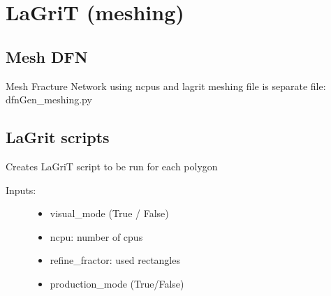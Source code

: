 \documentclass[letterpaper,10pt,english]{sphinxmanual}
\begin{document}
\section{LaGriT (meshing)}
\label{\detokenize{pydfnworks:lagrit-meshing}}

\subsection{Mesh DFN}
\label{\detokenize{pydfnworks:module-pydfnworks.meshdfn}}\label{\detokenize{pydfnworks:mesh-dfn}}\label{\detokenize{pydfnworks:module-meshdfn.py}}

\begin{fulllineitems}
\label{\detokenize{pydfnworks:pydfnworks.meshdfn.mesh_network}}
Mesh Fracture Network using ncpus and lagrit
meshing file is separate file: dfnGen\_meshing.py

\end{fulllineitems}



\subsection{LaGrit scripts}
\label{\detokenize{pydfnworks:lagrit-scripts}}\label{\detokenize{pydfnworks:module-pydfnworks.lagrit_scripts}}\label{\detokenize{pydfnworks:module-lagrit_scripts.py}}

\begin{fulllineitems}
\label{\detokenize{pydfnworks:pydfnworks.lagrit_scripts.create_lagrit_scripts}}
Creates LaGriT script to be run for each polygon
\begin{description}
\item[{Inputs: }] \leavevmode\begin{itemize}
\item {} 
visual\_mode (True / False)

\item {} 
ncpu: number of cpus

\item {} 
refine\_fractor: used rectangles

\item {} 
production\_mode (True/False)

\end{itemize}

\end{description}

\end{fulllineitems}
\end{document}
